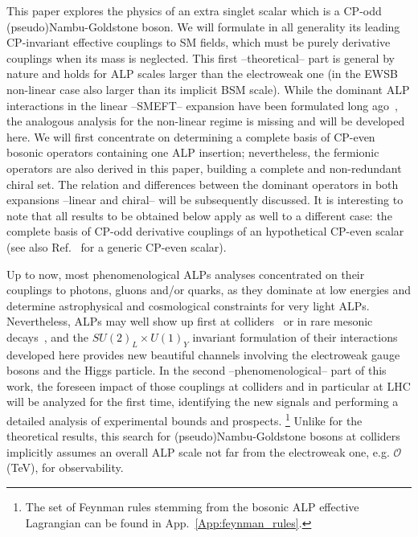 \documentclass[11pt]{article}
\renewcommand{\[}{\begin{equation}}
\renewcommand{\]}{\end{equation}}
\begin{document}
This paper explores  the physics of an extra singlet scalar which is a CP-odd (pseudo)Nambu-Goldstone boson. We will  
 formulate in all generality its leading CP-invariant effective couplings to SM fields, which must be purely derivative couplings when its mass is neglected. 
 This first --theoretical-- part   is general by nature and   
 holds for ALP scales larger than the electroweak one (in the EWSB non-linear case also larger than its implicit BSM scale). While the dominant ALP interactions in the linear --SMEFT-- expansion have been formulated long ago~\cite{Georgi:1986df}, the analogous analysis for the non-linear regime is missing  and will be developed here. We will first 
 concentrate on determining a complete basis of CP-even bosonic operators containing one ALP insertion;  nevertheless, the  fermionic operators are also 
 derived in this paper, building a complete and non-redundant chiral set. The relation and differences between the dominant operators in both 
 expansions --linear and chiral-- will be 
 subsequently discussed. It is interesting to note that all results to be obtained below apply as well to a different case: the complete basis of 
 CP-odd derivative couplings of an hypothetical CP-even scalar (see also Ref.~\cite{Gavela:2014vra} for a generic CP-even scalar).
 


Up to now, most phenomenological ALPs analyses concentrated on their couplings to  photons, 
gluons and/or quarks, as they dominate at low energies and determine 
astrophysical and cosmological constraints for very light ALPs. Nevertheless, ALPs may well show up first 
at colliders~\cite{Mimasu:2014nea,Jaeckel:2015jla,Alves:2016koo} or in rare mesonic decays~\cite{Dolan:2014ska,Izaguirre:2016dfi}, and the $SU(2)_L\times U(1)_Y$ invariant 
formulation of their interactions developed here provides new beautiful channels involving the electroweak gauge 
bosons  and the Higgs particle. In the second --phenomenological-- part of this work, the foreseen impact of 
those couplings at colliders and in particular at LHC will be analyzed  for the first time, identifying the new signals and performing 
a detailed analysis of experimental bounds and prospects. \footnote{ The set of Feynman rules stemming from the bosonic ALP effective Lagrangian can be found in App.~\ref{App:feynman_rules}.}  
 Unlike  for the theoretical results, this search for (pseudo)Nambu-Goldstone bosons at colliders  implicitly assumes an overall ALP scale not 
 far from the electroweak one, e.g. $\mathcal{O}$(TeV), for observability.
 
\end{document}
